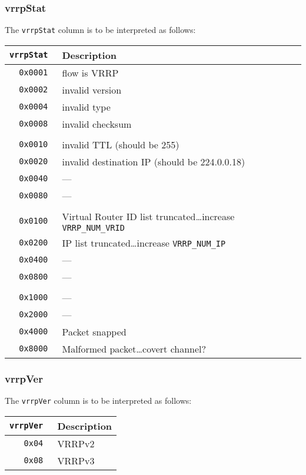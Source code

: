 \documentclass[documentation]{subfiles}
\begin{document}
\subsubsection{vrrpStat}\label{vrrpStat}
The {\tt vrrpStat} column is to be interpreted as follows:
\begin{longtable}{>{\tt}rl}
    \toprule
    {\bf vrrpStat} & {\bf Description}\\
    \midrule\endhead%
    0x0001 & flow is VRRP\\
    0x0002 & invalid version\\
    0x0004 & invalid type\\
    0x0008 & invalid checksum\\
    \\
    0x0010 & invalid TTL (should be 255)\\
    0x0020 & invalid destination IP (should be 224.0.0.18)\\
    0x0040 & ---\\%
    0x0080 & ---\\
    \\
    0x0100 & Virtual Router ID list truncated\ldots increase {\tt VRRP\_NUM\_VRID}\\
    0x0200 & IP list truncated\ldots increase {\tt VRRP\_NUM\_IP}\\
    0x0400 & ---\\
    0x0800 & ---\\
    \\
    0x1000 & ---\\
    0x2000 & ---\\
    0x4000 & Packet snapped\\
    0x8000 & Malformed packet\ldots covert channel?\\
    \bottomrule
\end{longtable}

\subsubsection{vrrpVer}\label{vrrpVer}
The {\tt vrrpVer} column is to be interpreted as follows:
\begin{longtable}{>{\tt}rl}
    \toprule
    {\bf vrrpVer} & {\bf Description}\\
    \midrule\endhead%
    0x04 & VRRPv2\\
    0x08 & VRRPv3\\
    \bottomrule
\end{longtable}
\end{document}
